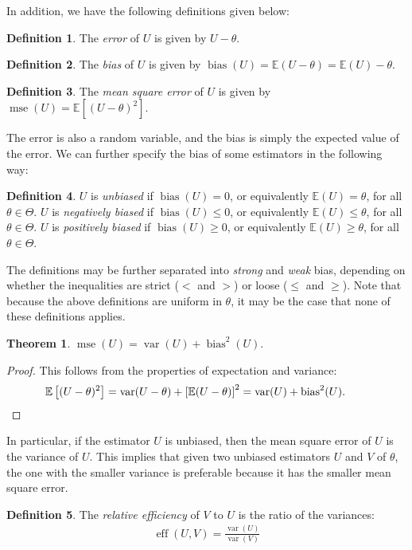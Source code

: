 \documentclass[a4paper,12pt]{article}
\theoremstyle{definition}
\newtheorem{theorem}{Theorem}[section]
\theoremstyle{definition}
\theoremstyle{definition}
\newtheorem{definition}{Definition}[section]
\newcommand{\var}{\operatorname{var}}
\newcommand{\bias}{\operatorname{bias}}
\newcommand{\mse}{\operatorname{mse}}
\newcommand{\eff}{\operatorname{eff}}
\begin{document}
    In addition, we have the following definitions given below:
    \begin{definition}
        The \textit{error} of $U$ is given by $U - \theta$.
    \end{definition}
    \begin{definition}
        The \textit{bias} of $U$ is given by $\bias(U) = \mathbb{E}(U - \theta) = \mathbb{E}(U) - \theta$.
    \end{definition}
    \begin{definition}
        The \textit{mean square error} of $U$ is given by $\mse(U) = \mathbb{E} \left[ (U - \theta)^2 \right]$.
    \end{definition}
    The error is also a random variable, and the bias is simply the expected value of the error. We can further specify the bias of some estimators in the following way:
    \begin{definition}
        $U$ is \textit{unbiased} if $\bias(U) = 0$, or equivalently $\mathbb{E}(U) = \theta$, for all $\theta \in \Theta$.
        $U$ is \textit{negatively biased} if $\bias(U) \leq 0$, or equivalently $\mathbb{E}(U) \leq \theta$, for all $\theta \in \Theta$.
        $U$ is \textit{positively biased} if $\bias(U) \geq 0$, or equivalently $\mathbb{E}(U) \geq \theta$, for all $\theta \in \Theta$.
    \end{definition}
    The definitions may be further separated into \textit{strong} and \textit{weak} bias, depending on whether the inequalities are strict ($<$ and $>$) or loose ($\leq$ and $\geq$). Note that because the above definitions are uniform in $\theta$, it may be the case that none of these definitions applies. 
    \begin{theorem}
        $\mse(U) = \var(U) + \bias^2(U)$.
        \begin{proof}
            This follows from the properties of expectation and variance:
            \begin{align*}
                \mathbb{E} \left[ (U - \theta)^2 \right] = \var(U - \theta) + \left[ \mathbb{E}(U - \theta) \right]^2 = \var(U) + \bias^2(U). \qquad \qedhere
            \end{align*}
        \end{proof}
    \end{theorem}
    In particular, if the estimator $U$ is unbiased, then the mean square error of $U$ is the variance of $U$. This implies that given two unbiased estimators $U$ and $V$ of $\theta$, the one with the smaller variance is preferable because it has the smaller mean square error. \par
    \begin{definition}
        The \textit{relative efficiency} of $V$ to $U$ is the ratio of the variances:
        \begin{align*}
            \eff(U, V) = \frac{\var(U)}{\var(V)}
        \end{align*}
    \end{definition}
\end{document}
